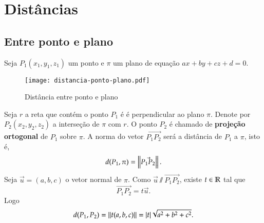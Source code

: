 

\section{Dist\^ancias} %
\label{sec:distancias}
\subsection{Entre ponto e plano} %
\label{sub:entre_ponto_e_plano}
Seja $P_1(x_1,y_1,z_1)$ um ponto e $\pi$ um plano de equa\c{c}\~ao $ax + by + cz + d = 0$.
\begin{figure}[h]
    \centering
    \caption{Dist\^ancia entre ponto e plano}
    \texttt{[image: distancia-ponto-plano.pdf]}

\end{figure}
Seja $r$ a reta que cont\'em o ponto $P_1$ \'e \'e perpendicular ao plano $\pi$. Denote por $P_2(x_2,y_2,z_2)$ a interse\c{c}\~ao de $\pi$ com $r$. O ponto $P_2$ \'e chamado de \textbf{proje\c{c}\~ao ortogonal} de $P_1$ sobre $\pi$. A norma do vetor $\vec{P_1P_2}$ ser\'a a dist\^ancia de $P_1$ a $\pi$, isto \'e,
\[
    d(P_1,\pi) = \left\Vert{\vec{P_1P_2}}\right\Vert.
\]
Seja $\vec{u} = (a,b,c)$ o vetor normal de $\pi$. Como $\vec{u}\varparallel\vec{P_1P_2}$, existe $t \in \mathbb{R}$ tal que
\[
    \vec{P_1P_2} = t\vec{u}.
\]
Logo
\begin{equation}\label{equacaodistanciapontoplano}
    d(P_1,P_2) = \left\Vert{t(a,b,c)}\right\Vert = |t|\sqrt{a^2 + b^2 + c^2}.
\end{equation}
